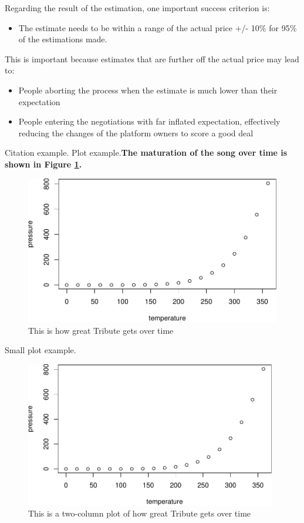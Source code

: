 \documentclass[sigchi]{acmart}
\def\tightlist{}
\begin{document}
Regarding the result of the estimation, one important success criterion is:

\begin{itemize}
\tightlist
\item
  The estimate needs to be within a range of the actual price +/- 10\% for 95\% of the estimations made.
\end{itemize}

This is important because estimates that are further off the actual price may lead to:

\begin{itemize}
\tightlist
\item
  People aborting the process when the estimate is much lower than their expectation
\item
  People entering the negotiations with far inflated expectation, effectively reducing the changes of the platform owners to score a good deal
\end{itemize}

Citation example.\citep{Aditya}
Plot example.\textbf{The maturation of the song over time is shown in Figure \ref{fig:tribute-plot}.}

\begin{figure}
\includegraphics[width=0.98\columnwidth]{step6_files/figure-latex/tribute-plot-1} \caption{This is how great Tribute gets over time}\label{fig:tribute-plot}
\end{figure}

Small plot example.

\begin{figure}
\includegraphics[width=0.98\textwidth]{step6_files/figure-latex/two-col-tribute-plot-1} \caption{This is a two-column plot of how great Tribute gets over time}\label{fig:two-col-tribute-plot}
\end{figure}
\end{document}
